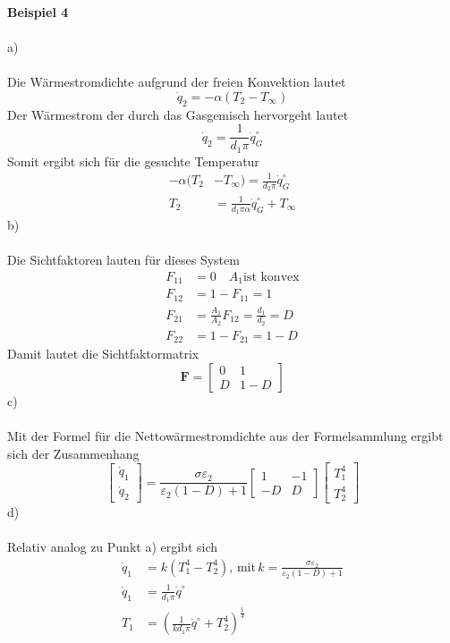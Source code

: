 \newpage
\noindent
\textbf{Beispiel 4}\\ \\
a)\\ \\
Die Wärmestromdichte aufgrund der freien Konvektion lautet
\[
	\dot{q}_2 = -\alpha(T_2 - T_\infty)
\]
Der Wärmestrom der durch das Gasgemisch hervorgeht lautet
\[
	\dot{q}_2 = \frac{1}{d_1\pi}\dot{q}_G^\circ
\]
Somit ergibt sich für die gesuchte Temperatur
\begin{align*}
	-\alpha(T_2 &- T_\infty) = \frac{1}{d_2\pi}\dot{q}_G^\circ \\
	T_2 &= \frac{1}{d_1\pi\alpha}\dot{q}_G^\circ + T_\infty
\end{align*}
b)\\ \\
Die Sichtfaktoren lauten für dieses System
\begin{align*}
	F_{11} &= 0 \quad A_1 \text{ist konvex} \\
	F_{12} &= 1 - F_{11} = 1 \\
	F_{21} &= \frac{A_1}{A_2}F_{12} = \frac{d_1}{d_2} = D \\
	F_{22} &= 1 - F_{21} = 1 - D
\end{align*}
Damit lautet die Sichtfaktormatrix
\[
	\textbf{F} = \begin{bmatrix}
		0 & 1 \\
		D & 1 - D
	\end{bmatrix}
\]
c)\\ \\
Mit der Formel für die Nettowärmestromdichte aus der Formelsammlung ergibt sich der Zusammenhang
\[
	\begin{bmatrix}
		\dot{q}_1 \\
		\dot{q}_2
	\end{bmatrix}
	=
	\frac{\sigma\varepsilon_2}{\varepsilon_2(1 - D) + 1}
	\begin{bmatrix}
		1 & -1 \\
		-D & D
	\end{bmatrix}
	\begin{bmatrix}
		T_1^4 \\
		T_2^4
	\end{bmatrix}
\]
d)\\ \\
Relativ analog zu Punkt a) ergibt sich
\begin{align*}
	\dot{q}_1 &= k(T_1^4 - T_2^4), \, \text{mit} \, k = \frac{\sigma\varepsilon_2}{\varepsilon_2(1 - D) + 1} \\
	\dot{q}_1 &= \frac{1}{d_1\pi}\dot{q}^\circ \\
	T_1 &= \left(\frac{1}{kd_1\pi}\dot{q}^\circ + T_2^4\right)^{\frac{1}{4}}
\end{align*}
